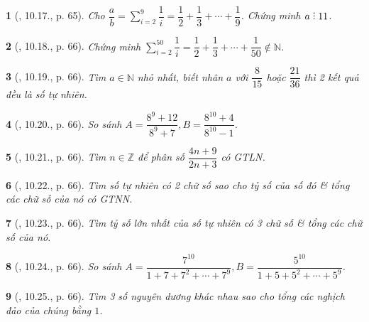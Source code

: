 \documentclass{article}
\newtheorem{baitoan}{}
\DeclareRobustCommand{\divby}{%
	\mathrel{\vbox{\baselineskip.65ex\lineskiplimit0pt\hbox{.}\hbox{.}\hbox{.}}}%
}
\begin{document}
\begin{baitoan}[\cite{TLCT_THCS_Toan_6_so_hoc}, 10.17., p. 65]
	Cho $\dfrac{a}{b} = \sum_{i=2}^9 \dfrac{1}{i} = \dfrac{1}{2} + \dfrac{1}{3} + \cdots + \dfrac{1}{9}$. Chứng minh $a\divby11$.
\end{baitoan}

\begin{baitoan}[\cite{TLCT_THCS_Toan_6_so_hoc}, 10.18., p. 66]
	Chứng minh $\sum_{i=2}^{50} \dfrac{1}{i} = \dfrac{1}{2} + \dfrac{1}{3} + \cdots + \dfrac{1}{50}\notin\mathbb{N}$.
\end{baitoan}

\begin{baitoan}[\cite{TLCT_THCS_Toan_6_so_hoc}, 10.19., p. 66]
	Tìm $a\in\mathbb{N}$ nhỏ nhất, biết nhân $a$ với $\dfrac{8}{15}$ hoặc $\dfrac{21}{36}$ thì 2 kết quả đều là số tự nhiên.
\end{baitoan}

\begin{baitoan}[\cite{TLCT_THCS_Toan_6_so_hoc}, 10.20., p. 66]
	So sánh $A = \dfrac{8^9 + 12}{8^9 + 7},B = \dfrac{8^{10} + 4}{8^{10} - 1}$.
\end{baitoan}

\begin{baitoan}[\cite{TLCT_THCS_Toan_6_so_hoc}, 10.21., p. 66]
	Tìm $n\in\mathbb{Z}$ để phân số $\dfrac{4n + 9}{2n + 3}$ có {\rm GTLN}.
\end{baitoan}

\begin{baitoan}[\cite{TLCT_THCS_Toan_6_so_hoc}, 10.22., p. 66]
	Tìm số tự nhiên có 2 chữ số sao cho tỷ số của số đó \& tổng các chữ số của nó có {\rm GTNN}.
\end{baitoan}

\begin{baitoan}[\cite{TLCT_THCS_Toan_6_so_hoc}, 10.23., p. 66]
	Tìm tỷ số lớn nhất của số tự nhiên có 3 chữ số \& tổng các chữ số của nó.
\end{baitoan}

\begin{baitoan}[\cite{TLCT_THCS_Toan_6_so_hoc}, 10.24., p. 66]
	So sánh $A = \dfrac{7^{10}}{1 + 7 + 7^2 + \cdots + 7^9},B = \dfrac{5^{10}}{1 + 5 + 5^2 + \cdots + 5^9}$.
\end{baitoan}

\begin{baitoan}[\cite{TLCT_THCS_Toan_6_so_hoc}, 10.25., p. 66]
	Tìm 3 số nguyên dương khác nhau sao cho tổng các nghịch đảo của chúng bằng $1$.
\end{baitoan}
\end{document}

